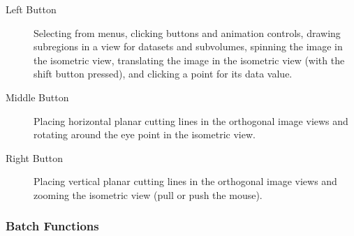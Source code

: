 \begin{description}
\item [Left Button]  Selecting from menus, clicking buttons and animation controls,
drawing subregions in a view for datasets and subvolumes, spinning the image
in the isometric view, translating the image in the isometric view (with the
shift button pressed), and clicking a point for its data value.

\item [Middle Button]  Placing horizontal planar cutting lines in the
orthogonal image views and rotating around the eye point in the isometric view.

\item [Right Button]   Placing vertical planar cutting lines in the
orthogonal image views and zooming the isometric view (pull or push the mouse).

\end{description}


\subsubsection{Batch Functions}

